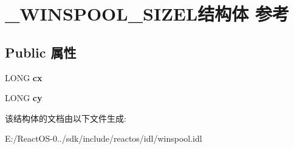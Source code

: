 \hypertarget{struct___w_i_n_s_p_o_o_l___s_i_z_e_l}{}\section{\+\_\+\+W\+I\+N\+S\+P\+O\+O\+L\+\_\+\+S\+I\+Z\+E\+L结构体 参考}
\label{struct___w_i_n_s_p_o_o_l___s_i_z_e_l}
\subsection*{Public 属性}
\begin{DoxyCompactItemize}
\item 
\mbox{\label{struct___w_i_n_s_p_o_o_l___s_i_z_e_l_a92b7c39c1ef0ef015c7f7a06308a2e78}} 
L\+O\+NG {\bfseries cx}
\item 
\mbox{\label{struct___w_i_n_s_p_o_o_l___s_i_z_e_l_ad8d1610018a33a1ad8bd9751eb787900}} 
L\+O\+NG {\bfseries cy}
\end{DoxyCompactItemize}


该结构体的文档由以下文件生成\+:\begin{DoxyCompactItemize}
\item 
E\+:/\+React\+O\+S-\/0../sdk/include/reactos/idl/winspool.\+idl\end{DoxyCompactItemize}
